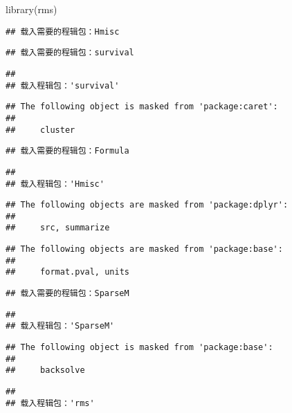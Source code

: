 \documentclass[]{ctexbook}
\newenvironment{Shaded}{\begin{snugshade}}{\end{snugshade}}
\newcommand{\FunctionTok}[1]{\textcolor[rgb]{0.00,0.00,0.00}{#1}}
\newcommand{\NormalTok}[1]{#1}
\begin{document}
\begin{Shaded}
\begin{Highlighting}[]
\FunctionTok{library}\NormalTok{(rms)}
\end{Highlighting}
\end{Shaded}

\begin{verbatim}
## 载入需要的程辑包：Hmisc
\end{verbatim}

\begin{verbatim}
## 载入需要的程辑包：survival
\end{verbatim}

\begin{verbatim}
## 
## 载入程辑包：'survival'
\end{verbatim}

\begin{verbatim}
## The following object is masked from 'package:caret':
## 
##     cluster
\end{verbatim}

\begin{verbatim}
## 载入需要的程辑包：Formula
\end{verbatim}

\begin{verbatim}
## 
## 载入程辑包：'Hmisc'
\end{verbatim}

\begin{verbatim}
## The following objects are masked from 'package:dplyr':
## 
##     src, summarize
\end{verbatim}

\begin{verbatim}
## The following objects are masked from 'package:base':
## 
##     format.pval, units
\end{verbatim}

\begin{verbatim}
## 载入需要的程辑包：SparseM
\end{verbatim}

\begin{verbatim}
## 
## 载入程辑包：'SparseM'
\end{verbatim}

\begin{verbatim}
## The following object is masked from 'package:base':
## 
##     backsolve
\end{verbatim}

\begin{verbatim}
## 
## 载入程辑包：'rms'
\end{verbatim}
\end{document}
